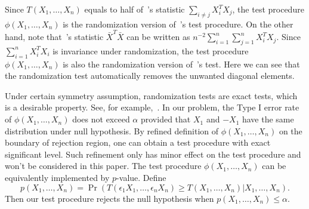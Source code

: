 \documentclass[3p]{elsarticle}
\theoremstyle{plain}
\theoremstyle{definition}
\theoremstyle{remark}
\begin{document}
 Since $T(X_1,\ldots,X_n)$ equals to half of~\citet{Chen2010A}'s statistic $\sum_{i\neq j}X_i^T X_j$, the test procedure $\phi(X_1,\ldots,X_n)$ is the randomization version of~\citet{Chen2010A}'s test procedure.
 On the other hand, note that~\citet{Bai1996Efiect}'s statistic $\bar{X}^T \bar{X}$ can be written as $n^{-2}\sum_{i=1}^n\sum_{j=1}^n X_i^T X_j$.
 Since $\sum_{i=1}^n X_i^T X_i$ is invariance under randomization, the test procedure $\phi(X_1,\ldots,X_n)$ is also the randomization version of~\citet{Bai1996Efiect}'s test.
 Here we can see that the randomization test automatically removes the unwanted diagonal elements.


Under certain symmetry assumption, randomization tests are exact tests, which is a desirable property.
 See, for example,~\citet[Chapter 15]{Lehmann}.
In our problem, the Type I error rate of $\phi(X_1,\ldots,X_n)$ does not exceed $\alpha$ provided that $X_1$ and $-X_1$ have the same distribution under null hypothesis.
 By refined definition of $\phi(X_1,\ldots,X_n)$ on the boundary of rejection region, one can obtain a test procedure with exact significant  level. 
Such refinement only has minor effect on the test procedure and won't be considered in this paper.
The test procedure $\phi(X_1,\ldots, X_n)$ can be equivalently implemented by $p$-value. Define 
\begin{equation}\label{firstPvalue}
        p(X_1,\ldots, X_n)
        =\Pr(T(\epsilon_1 X_1,\ldots,\epsilon_n X_n)\geq T( X_1,\ldots,X_n)|X_1,\ldots,X_n).
\end{equation}
Then our test procedure rejects the null hypothesis when $p(X_1,\ldots, X_n)\leq \alpha$. 
\end{document}
